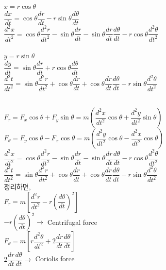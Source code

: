 \documentclass[11pt]{beamer}
\begin{document}
\begin{frame}{2.2}\footnotesize

$ x = r \cos \theta $ \\

$\dfrac{dx}{dt} = \cos \theta \dfrac{dr}{dt} - r \sin \theta \dfrac{d\theta}{dt}$ \\

$\dfrac{d^{2}x}{dt^{2}} = \cos \theta \dfrac{d^{2}r}{dt^{2}} - \sin \theta \dfrac{dr}{dt} - \sin \theta \dfrac{dr}{dt} \dfrac{d\theta}{dt} -r \cos \theta \dfrac{d^{2}\theta}{dt^{2}}$\\
\\
$ y = r \sin \theta $ \\

$\dfrac{dy}{dt} = \sin \theta \dfrac{dr}{dt} + r \cos \theta \dfrac{d\theta}{dt}$ \\

$\dfrac{d^{2}t}{dt^{2}} = \sin \theta \dfrac{d^{2}r}{dt^{2}} + \cos \theta \dfrac{dr}{dt} + \cos \theta \dfrac{dr}{dt} \dfrac{d\theta}{dt} -r \sin \theta \dfrac{d^{2}\theta}{dt^{2}}$\\
\\

\end{frame}

\begin{frame}{2.3}\footnotesize

$ F_{r} = F_{x} \cos \theta + F_{y} \sin \theta 
= m \left ( \dfrac{d^{2}x}{dt^{2}} \cos \theta + \dfrac{d^{2}y}{dt^{2}} \sin \theta \right) $\\

$ F_{\theta} = F_{y} \cos \theta - F_{x} \cos \theta 
= m \left ( \dfrac{d^{2}y}{dt^{2}} \cos \theta - \dfrac{d^{2}x}{dt^{2}} \cos \theta \right) $\\

$\dfrac{d^{2}x}{dt^{2}} = \cos \theta \dfrac{d^{2}r}{dt^{2}} - \sin \theta \dfrac{dr}{dt} - \sin \theta \dfrac{dr}{dt} \dfrac{d\theta}{dt} -r \cos \theta \dfrac{d^{2}\theta}{dt^{2}}$\\

$\dfrac{d^{2}t}{dt^{2}} = \sin \theta \dfrac{d^{2}r}{dt^{2}} + \cos \theta \dfrac{dr}{dt} + \cos \theta \dfrac{dr}{dt} \dfrac{d\theta}{dt} -r \sin \theta \dfrac{d^{2}\theta}{dt^{2}}$\\


정리하면, \\

$ F_{r} = m \left[ \dfrac{d^{2}r}{dt^{2}} - r \left( {\dfrac{d \theta}{dt}} \right)^{2} \right] $\\

$ -r \left( {\dfrac{d \theta}{dt}} \right)^{2} \rightarrow $ Centrifugal force \\

$ F_{\theta} = m \left[ r \dfrac{d^{2}\theta}{dt^{2}} + 2 \dfrac{dr}{dt} \dfrac{d\theta}{dt}  \right] $\\

$ 2 \dfrac{dr}{dt} \dfrac{d\theta}{dt} \rightarrow $ Coriolis force \\

\end{frame}
\end{document}
